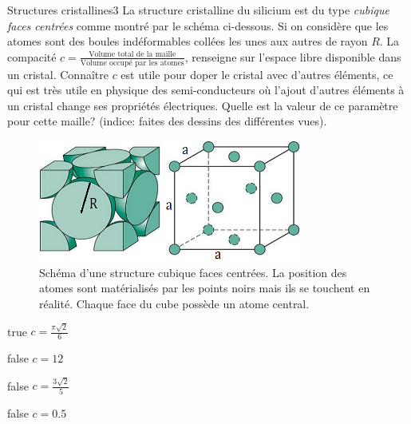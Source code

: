 \documentclass[11pt]{article}
\begin{document}
        \begin{question}{31}{Structures cristallines}{3}{}
            La structure cristalline du silicium est du type \emph{cubique faces centrées} comme montré par le schéma ci-dessous. Si on considère que les atomes sont des boules indéformables collées les unes aux autres de rayon $R$. La compacité $c = \frac{\text{Volume total de la maille}}{\text{Volume occupé par les atomes}}$, renseigne sur l'espace libre disponible dans un cristal. Connaître $c$ est utile pour doper le cristal avec d'autres éléments, ce qui est très utile en physique des semi-conducteurs où l'ajout d'autres éléments à un cristal change ses propriétés électriques. Quelle est la valeur de ce paramètre pour cette maille? (indice: faites des dessins des différentes vues).
            \begin{figure}
                \centering
                \includegraphics[height = 4cm]{Antoine/Figures_Antoine/FCC.png}
                \caption{Schéma d'une structure cubique faces centrées. La position des atomes sont matérialisés par les points noirs mais ils se touchent en réalité.  Chaque face du cube possède un atome central.}
            \end{figure}
        \end{question}
        \begin{reponses} 
            \item[true] $c = \frac{\pi\sqrt{2}}{6}$
            \item[false] $c = 12$
            \item[false] $c = \frac{3\sqrt{2}}{5}$
    	    \item[false] $c = \num{0.5}$
        \end{reponses}
        
\end{document}
